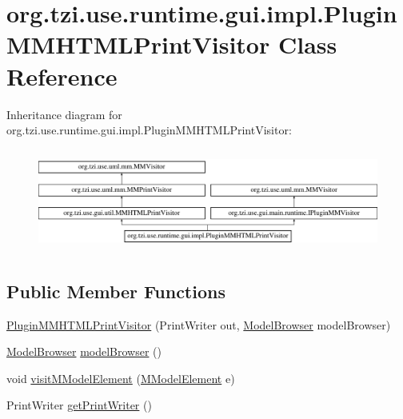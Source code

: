 \hypertarget{classorg_1_1tzi_1_1use_1_1runtime_1_1gui_1_1impl_1_1_plugin_m_m_h_t_m_l_print_visitor}{\section{org.\-tzi.\-use.\-runtime.\-gui.\-impl.\-Plugin\-M\-M\-H\-T\-M\-L\-Print\-Visitor Class Reference}
\label{classorg_1_1tzi_1_1use_1_1runtime_1_1gui_1_1impl_1_1_plugin_m_m_h_t_m_l_print_visitor}
}
Inheritance diagram for org.\-tzi.\-use.\-runtime.\-gui.\-impl.\-Plugin\-M\-M\-H\-T\-M\-L\-Print\-Visitor\-:\begin{figure}[H]
\begin{center}
\leavevmode
\includegraphics[height=3.414634cm]{classorg_1_1tzi_1_1use_1_1runtime_1_1gui_1_1impl_1_1_plugin_m_m_h_t_m_l_print_visitor}
\end{center}
\end{figure}
\subsection*{Public Member Functions}
\begin{DoxyCompactItemize}
\item 
\hyperlink{classorg_1_1tzi_1_1use_1_1runtime_1_1gui_1_1impl_1_1_plugin_m_m_h_t_m_l_print_visitor_ac79935e18071af97f35f88c5c1c8712f}{Plugin\-M\-M\-H\-T\-M\-L\-Print\-Visitor} (Print\-Writer out, \hyperlink{classorg_1_1tzi_1_1use_1_1gui_1_1main_1_1_model_browser}{Model\-Browser} model\-Browser)
\item 
\hyperlink{classorg_1_1tzi_1_1use_1_1gui_1_1main_1_1_model_browser}{Model\-Browser} \hyperlink{classorg_1_1tzi_1_1use_1_1runtime_1_1gui_1_1impl_1_1_plugin_m_m_h_t_m_l_print_visitor_af6bef0e450160e9cd844a6fc815ff753}{model\-Browser} ()
\item 
void \hyperlink{classorg_1_1tzi_1_1use_1_1runtime_1_1gui_1_1impl_1_1_plugin_m_m_h_t_m_l_print_visitor_abe883aa23209e53d8f810ae6010c77b4}{visit\-M\-Model\-Element} (\hyperlink{interfaceorg_1_1tzi_1_1use_1_1uml_1_1mm_1_1_m_model_element}{M\-Model\-Element} e)
\item 
Print\-Writer \hyperlink{classorg_1_1tzi_1_1use_1_1runtime_1_1gui_1_1impl_1_1_plugin_m_m_h_t_m_l_print_visitor_a6304dd80fbdf0fed0f09f2d6bc31b481}{get\-Print\-Writer} ()
\end{DoxyCompactItemize}
